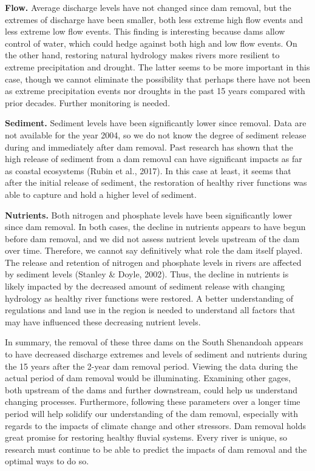 \documentclass[
  12pt,
]{article}
\begin{document}
\textbf{Flow.} Average discharge levels have not changed since dam
removal, but the extremes of discharge have been smaller, both less
extreme high flow events and less extreme low flow events. This finding
is interesting because dams allow control of water, which could hedge
against both high and low flow events. On the other hand, restoring
natural hydrology makes rivers more resilient to extreme precipitation
and drought. The latter seems to be more important in this case, though
we cannot eliminate the possibility that perhaps there have not been as
extreme precipitation events nor droughts in the past 15 years compared
with prior decades. Further monitoring is needed.

\textbf{Sediment.} Sediment levels have been significantly lower since
removal. Data are not available for the year 2004, so we do not know the
degree of sediment release during and immediately after dam removal.
Past research has shown that the high release of sediment from a dam
removal can have significant impacts as far as coastal ecosystems (Rubin
et al., 2017). In this case at least, it seems that after the initial
release of sediment, the restoration of healthy river functions was able
to capture and hold a higher level of sediment.

\textbf{Nutrients.} Both nitrogen and phosphate levels have been
significantly lower since dam removal. In both cases, the decline in
nutrients appears to have begun before dam removal, and we did not
assess nutrient levels upstream of the dam over time. Therefore, we
cannot say definitively what role the dam itself played. The release and
retention of nitrogen and phosphate levels in rivers are affected by
sediment levels (Stanley \& Doyle, 2002). Thus, the decline in nutrients
is likely impacted by the decreased amount of sediment release with
changing hydrology as healthy river functions were restored. A better
understanding of regulations and land use in the region is needed to
understand all factors that may have influenced these decreasing
nutrient levels.

In summary, the removal of these three dams on the South Shenandoah
appears to have decreased discharge extremes and levels of sediment and
nutrients during the 15 years after the 2-year dam removal period.
Viewing the data during the actual period of dam removal would be
illuminating. Examining other gages, both upstream of the dams and
further downstream, could help us understand changing processes.
Furthermore, following these parameters over a longer time period will
help solidify our understanding of the dam removal, especially with
regards to the impacts of climate change and other stressors. Dam
removal holds great promise for restoring healthy fluvial systems. Every
river is unique, so research must continue to be able to predict the
impacts of dam removal and the optimal ways to do so.
\end{document}
